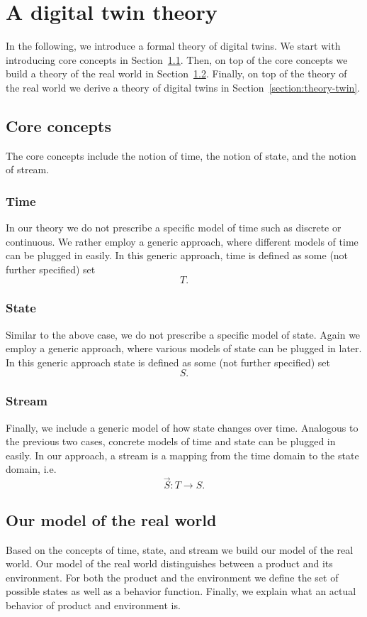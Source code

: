 \documentclass[conference]{IEEEtran}
\begin{document}
    \section{A digital twin theory}
    \label{section:theory}
    In the following, we introduce a formal theory of digital twins.
    We start with introducing core concepts in Section~\ref{section:theory-core}.
    Then, on top of the core concepts we build a theory of the real world in Section~\ref{section:theory-world}.
    Finally, on top of the theory of the real world we derive a theory of digital twins in Section~\ref{section:theory-twin}.

    \subsection{Core concepts}
    \label{section:theory-core}
    The core concepts include the notion of time, the notion of state, and the notion of stream.

    \subsubsection{Time}
    In our theory we do not prescribe a specific model of time such as discrete or continuous.
    We rather employ a generic approach, where different models of time can be plugged in easily.
    In this generic approach, time is defined as some (not further specified) set
    \[
        T.
    \]

    \subsubsection{State}
    Similar to the above case, we do not prescribe a specific model of state.
    Again we employ a generic approach, where various models of state can be plugged in later.
    In this generic approach state is defined as some (not further specified) set
    \[
        S.
    \]

    \subsubsection{Stream}
    Finally, we include a generic model of how state changes over time.
    Analogous to the previous two cases, concrete models of time and state can be plugged in easily.
    In our approach, a stream is a mapping from the time domain to the state domain, i.e.
    \[
        \overrightarrow{S}: T \rightarrow S.
    \]

    \subsection{Our model of the real world}
    \label{section:theory-world}
    Based on the concepts of time, state, and stream we build our model of the real world.
    Our model of the real world distinguishes between a product and its environment.
    For both the product and the environment we define the set of possible states as well as a behavior function.
    Finally, we explain what an actual behavior of product and environment is.
\end{document}
